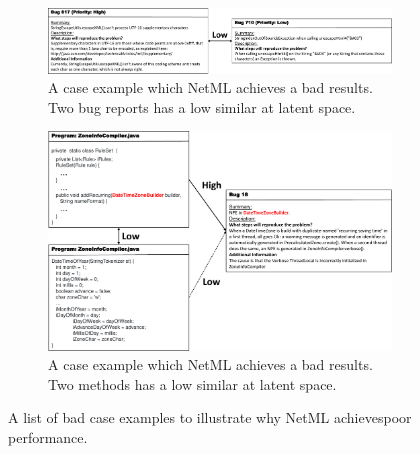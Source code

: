 \begin{figure}
	\centering
	\begin{subfigure}[b]{\textwidth}
		\centering
		\includegraphics[width=\textwidth]{bug_low}
		\caption[]%
		{{\small A case example which NetML achieves a bad results. Two bug reports has a low similar at latent space.}}    
		\label{fig:bug_low}
	\end{subfigure}
	\centering
	\begin{subfigure}[b]{\textwidth}  
		\centering 
		\includegraphics[width=\textwidth]{method_low_crop.pdf}
		\caption[]%
		{{\small A case example which NetML achieves a bad results. Two methods has a low similar at latent space.}}    
		\label{fig:method_low}
	\end{subfigure}
	\caption[]
	{\small A list of bad case examples to illustrate why NetML achievespoor performance.} 
	\label{fig:case_bad_example}
\end{figure}
